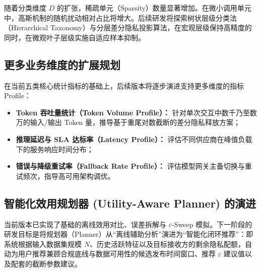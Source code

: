 随着分类维度 $D$ 的扩张，稀疏单元（Sparsity）数量显著增加。在微小调用单元中，高斯机制的随机扰动相对占比将增大。后续研发将探索树状层级分类法（Hierarchical Taxonomy）与分层差分隐私投影算法，在宏观层级保持高精度的同时，在微观叶子层级实施自适应样本抑制。

\subsection{更多业务维度的扩展规划}
在当前五类核心统计指标的基础上，后续版本将逐步演进支持更多维度的指标 Profile：
\begin{itemize}[leftmargin=2em]
  \item \textbf{Token 吞吐量统计（Token Volume Profile）：} 针对单次交互中数千乃至数万的输入/输出 Token 量，推导基于重尾对数截断的差分隐私释放方案；
  \item \textbf{推理延迟与 SLA 达标率（Latency Profile）：} 评估不同供应商在峰值负载下的服务响应时间分布；
  \item \textbf{错误与降级重试率（Fallback Rate Profile）：} 评估模型网关主备切换与重试频次，指导高可用架构调优。
\end{itemize}

\subsection{智能化效用规划器 (Utility-Aware Planner) 的演进}
当前版本已实现了基础的离线效用对比、误差拆解与 $\varepsilon$-Sweep 模拟。下一阶段的研发目标是将规划器（Planner）从“离线辅助分析”演进为“智能化闭环推荐”：即系统根据输入数据集规模 $N$、历史活跃特征以及目标接收方的剩余隐私配额，自动为用户推荐兼顾合规底线与数据可用性的候选发布时间窗口、推荐 $\varepsilon$ 建议值以及配套的截断参数建议。
